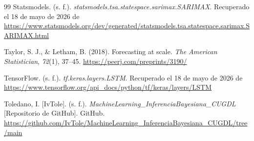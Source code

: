 \documentclass[11pt,a4paper]{report}
\begin{document}
\begin{thebibliography}{99}
Statsmodels. (s. f.). \textit{statsmodels.tsa.statespace.sarimax.SARIMAX}. Recuperado el 18 de mayo de 2026 de \url{https://www.statsmodels.org/dev/generated/statsmodels.tsa.statespace.sarimax.SARIMAX.html}

Taylor, S. J., \& Letham, B. (2018). Forecasting at scale. \textit{The American Statistician}, \textit{72}(1), 37–45. \url{https://peerj.com/preprints/3190/}

TensorFlow. (s. f.). \textit{tf.keras.layers.LSTM}. Recuperado el 18 de mayo de 2026 de \url{https://www.tensorflow.org/api_docs/python/tf/keras/layers/LSTM}

Toledano, I. [IvTole]. (s. f.). \textit{MachineLearning\_InferenciaBayesiana\_CUGDL} [Repositorio de GitHub]. GitHub. \url{https://github.com/IvTole/MachineLearning_InferenciaBayesiana_CUGDL/tree/main}

\end{thebibliography}
    
    
\end{document}
